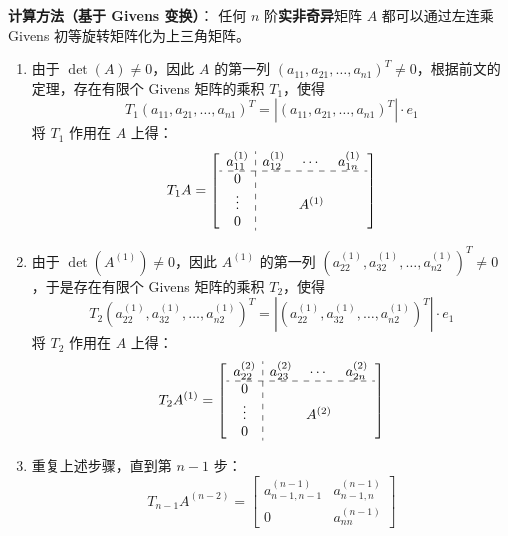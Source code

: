 \noindent\textbf{计算方法（基于 Givens 变换）}：
任何 $n$ 阶\textbf{实非奇异}矩阵 $A$ 都可以通过左连乘 Givens 初等旋转矩阵化为上三角矩阵。
\begin{enumerate}
    \item 由于 $\det(A)\neq0$，因此 $A$ 的第一列 $(a_{11},a_{21},\ldots,a_{n1})^T\neq 0$，根据前文的定理，存在有限个 Givens 矩阵的乘积 $T_1$，使得
    \[
        T_1(a_{11},a_{21},\ldots,a_{n1})^T=\left|(a_{11},a_{21},\ldots,a_{n1})^T\right|\cdot e_1
    \]
    将 $T_1$ 作用在 $A$ 上得：
    \[
        T_1A=\left[\begin{array}{c:ccc}
        a_{11}^{(1)}&a_{12}^{(1)}&\cdots&a_{1n}^{(1)}\\
        \hdashline
        0&&&\\
        \vdots&&A^{(1)}&\\
        0&&&
        \end{array}\right]
    \]

    \item 由于 $\det(A^{(1)})\neq0$，因此 $A^{(1)}$ 的第一列 $\left(a_{22}^{(1)},a_{32}^{(1)},\ldots,a_{n2}^{(1)}\right)^T\neq0$，于是存在有限个 Givens 矩阵的乘积 $T_2$，使得
    \[
        T_2\left(a_{22}^{(1)},a_{32}^{(1)},\ldots,a_{n2}^{(1)}\right)^T=\left|\left(a_{22}^{(1)},a_{32}^{(1)},\ldots,a_{n2}^{(1)}\right)^T\right|\cdot e_1
    \]
    将 $T_2$ 作用在 $A$ 上得：
    \[
        T_2A^{(1)}=\left[\begin{array}{c:ccc}
        a_{22}^{(2)}&a_{23}^{(2)}&\cdots&a_{2n}^{(2)}\\
        \hdashline
        0&&&\\
        \vdots&&A^{(2)}&\\
        0&&&
        \end{array}\right]
    \]

    \item 重复上述步骤，直到第 $n-1$ 步：
    \[
        T_{n-1}A^{(n-2)}=\begin{bmatrix}a_{n-1,n-1}^{(n-1)}&a_{n-1,n}^{(n-1)}\\0&a_{nn}^{(n- 1)}\end{bmatrix}
    \]


\end{enumerate}
